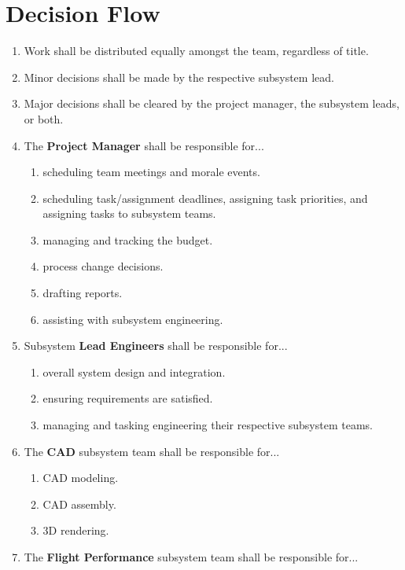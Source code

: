 \section{Decision Flow}

\begin{enumerate}
    \item Work shall be distributed equally amongst the team, regardless of title.
    \item Minor decisions shall be made by the respective subsystem lead.
    \item Major decisions shall be cleared by the project manager, the subsystem leads, or both.
    \item The \textbf{Project Manager} shall be responsible for...
    \begin{enumerate}
        \item scheduling team meetings and morale events.
        \item scheduling task/assignment deadlines, assigning task priorities, and assigning tasks to subsystem teams.
        \item managing and tracking the budget.
        \item process change decisions.
        \item drafting reports.
        \item assisting with subsystem engineering.
    \end{enumerate}
    \item Subsystem \textbf{Lead Engineers} shall be responsible for...
    \begin{enumerate}
        \item overall system design and integration.
        \item ensuring requirements are satisfied.
        \item managing and tasking engineering their respective subsystem teams.
    \end{enumerate}
    \item The \textbf{CAD} subsystem team shall be responsible for...
    \begin{enumerate}
        \item CAD modeling.
        \item CAD assembly.
        \item 3D rendering.
    \end{enumerate}
    \item The \textbf{Flight Performance} subsystem team shall be responsible for...
    \begin{enumerate}

\end{enumerate}
\end{enumerate}
